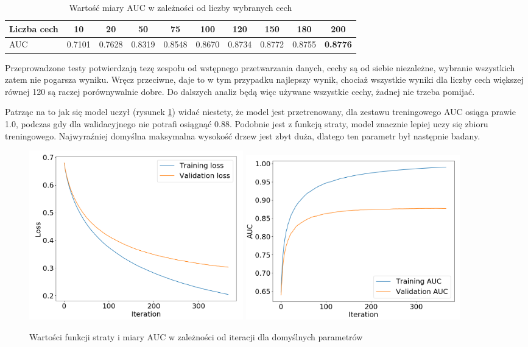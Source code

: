 \documentclass[12pt]{article}
\begin{document}
\begin{table}[h]
    \centering
    \begin{tabular}{|l|c|c|c|c|c|c|c|c|c|}
        \hline
        Liczba cech & 10 & 20 & 50 & 75 & 100 & 120 & 150 & 180 & \textbf{200} \\ \hline
        AUC & 0.7101 & 0.7628 & 0.8319 & 0.8548 & 0.8670 & 0.8734 & 0.8772 & 0.8755 & \textbf{0.8776} \\ \hline
    \end{tabular}
    \caption{Wartość miary AUC w zależności od liczby wybranych cech}
    \label{tab:xgboost_feature_count}
\end{table}

Przeprowadzone testy potwierdzają tezę zespołu od wstępnego przetwarzania danych, cechy są od siebie niezależne, wybranie wszystkich zatem nie pogarsza wyniku. Wręcz przeciwne, daje to w tym przypadku najlepszy wynik, chociaż wszystkie wyniki dla liczby cech większej równej 120 są raczej porównywalnie dobre. Do dalszych analiz będą więc używane wszystkie cechy, żadnej nie trzeba pomijać.

Patrząc na to jak się model uczył (rysunek \ref{fig:xgboost_training_overfitting}) widać niestety, że model jest przetrenowany, dla zestawu treningowego AUC osiąga prawie 1.0, podczas gdy dla walidacyjnego nie potrafi osiągnąć 0.88. Podobnie jest z funkcją straty, model znacznie lepiej uczy się zbioru treningowego. Najwyraźniej domyślna maksymalna wysokość drzew jest zbyt duża, dlatego ten parametr był następnie badany.

\begin{figure}[h]
    \centering
\includegraphics[width=0.45\textwidth]{xgboost/overfitting_loss.png}
\includegraphics[width=0.45\textwidth]{xgboost/overfitting_auc.png}
    \caption{Wartości funkcji straty i miary AUC w zależności od iteracji dla domyślnych parametrów}
    \label{fig:xgboost_training_overfitting}
\end{figure}
\end{document}
